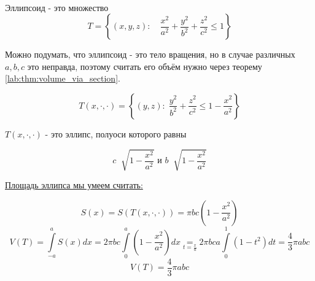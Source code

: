 \documentclass[../main.tex]{subfiles}
\begin{document}
\begin{example}
    
    ~


    Эллипсоид - это множество 
    \[ T=\left\{ \left( x,y,z\right):\quad \dfrac{ x^2}{ a^2}+ \dfrac{ y^2}{ b^2}+ \dfrac{ z^2}{ c^2} \leq 1\right\}\]

    Можно подумать, что эллипсоид - это тело вращения, но в случае различных
    \( a,b,c\) это неправда, поэтому считать его объём нужно через теорему \ref{lab:thm:volume_via_section}. 

    \[ T\left( x,\cdot,\cdot\right)=\left\{ \left( y,z\right):\; \dfrac{ y^2}{ b^2}+ \dfrac{ z^2}{ c^2} \leq 1- \dfrac{ x^2}{ a^2}\right\}\]


    \( T\left( x,\cdot,\cdot\right)\) - это эллипс, полуоси которого равны

    \[ c \;\sqrt[]{1- \dfrac{ x^2}{ a^2}} \text{ и } b \;\sqrt[]{1- \dfrac{ x^2}{ a^2}}\]

    \hyperlink{thm:elips_area}{Площадь эллипса мы умеем считать:}

    \[ S\left( x\right)= S\left( T\left( x,\cdot,\cdot\right)\right)= \pi bc\left( 1- \dfrac{ x^2}{ a^2}\right)\]
    \[ V\left( T\right)= \displaystyle\int\limits_{ -a}^{ a} S\left( x\right)dx=2 \pi bc \displaystyle\int\limits_{ 0}^{ a} \left( 1- \dfrac{ x^2}{ a^2}\right)dx \underset{t= \frac{ x}{ a}}{=}2 \pi bca \displaystyle\int\limits_{ 0}^{ 1} \left( 1-t^2\right)dt= \dfrac{ 4}{ 3} \pi abc\]
    \[ \boxed{V\left( T\right)= \dfrac{ 4}{ 3} \pi abc}\]
\end{example}
\end{document}
